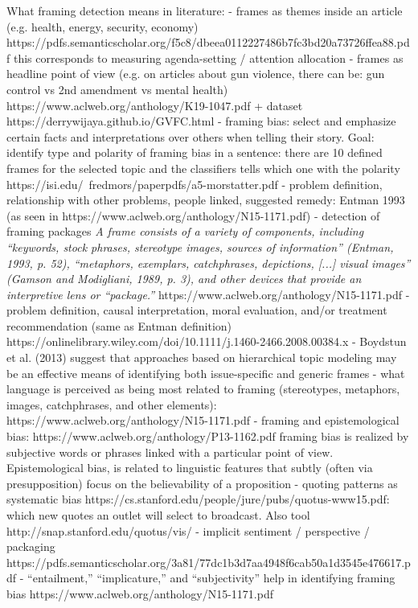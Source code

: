 What framing detection means in literature:
- frames as themes inside an article (e.g. health, energy, security, economy) https://pdfs.semanticscholar.org/f5c8/dbeea0112227486b7fc3bd20a73726ffea88.pdf this corresponds to measuring agenda-setting / attention allocation
- frames as headline point of view (e.g. on articles about gun violence, there can be: gun control vs 2nd amendment vs mental health) https://www.aclweb.org/anthology/K19-1047.pdf + dataset
https://derrywijaya.github.io/GVFC.html
- framing bias: select and emphasize certain facts and interpretations over others when telling their story. Goal: identify type and polarity of framing bias in a sentence: there are 10 defined frames for the selected topic and the classifiers tells which one with the polarity https://isi.edu/~fredmors/paperpdfs/a5-morstatter.pdf
- problem definition, relationship with other problems, people linked, suggested remedy: Entman 1993 (as seen in https://www.aclweb.org/anthology/N15-1171.pdf)
- detection of framing packages  \textit{A frame consists of a variety of components, including “keywords, stock phrases, stereotype images, sources of information” (Entman, 1993, p. 52), “metaphors, exemplars, catchphrases, depictions, [...] visual images” (Gamson and Modigliani, 1989, p. 3), and other devices that provide an interpretive lens or “package.”} https://www.aclweb.org/anthology/N15-1171.pdf
- problem definition, causal interpretation, moral evaluation, and/or treatment recommendation (same as Entman definition) https://onlinelibrary.wiley.com/doi/10.1111/j.1460-2466.2008.00384.x
- Boydstun et al. (2013) suggest that approaches based on hierarchical topic modeling may be an effective means of identifying both issue-specific and generic frames
- what language is perceived as being most related to framing (stereotypes, metaphors, images, catchphrases, and other elements): https://www.aclweb.org/anthology/N15-1171.pdf
- framing and epistemological bias: https://www.aclweb.org/anthology/P13-1162.pdf framing bias is realized by subjective words or phrases linked with a particular point of view. Epistemological bias, is related to linguistic features that subtly (often via presupposition) focus on the believability of a proposition
- quoting patterns as systematic bias https://cs.stanford.edu/people/jure/pubs/quotus-www15.pdf: which new quotes an outlet will select to broadcast. Also tool http://snap.stanford.edu/quotus/vis/
- implicit sentiment / perspective / packaging https://pdfs.semanticscholar.org/3a81/77dc1b3d7aa4948f6cab50a1d3545e476617.pdf
- “entailment,” “implicature,” and “subjectivity” help in identifying framing bias https://www.aclweb.org/anthology/N15-1171.pdf


